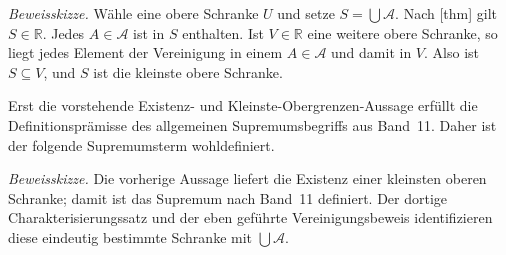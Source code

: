 \documentclass[main.tex]{subfiles}
\begin{document}

\emph{Beweisskizze.}
Wähle eine obere Schranke \(U\) und setze \(S=\bigcup\mathcal A\). Nach
[thm] gilt \(S\in\mathbb R\).
Jedes \(A\in\mathcal A\) ist in \(S\) enthalten. Ist \(V\in\mathbb R\)
eine weitere obere Schranke, so liegt jedes Element der Vereinigung in einem
\(A\in\mathcal A\) und damit in \(V\). Also ist \(S\subseteq V\), und \(S\)
ist die kleinste obere Schranke.

Erst die vorstehende Existenz- und Kleinste-Obergrenzen-Aussage erfüllt die
Definitionsprämisse des allgemeinen Supremumsbegriffs aus Band~11. Daher ist
der folgende Supremumsterm wohldefiniert.


\emph{Beweisskizze.}
Die vorherige Aussage liefert die Existenz einer kleinsten oberen Schranke;
damit ist das Supremum nach Band~11 definiert. Der dortige
Charakterisierungssatz und der eben geführte Vereinigungsbeweis identifizieren
diese eindeutig bestimmte Schranke mit \(\bigcup\mathcal A\).
\end{document}
